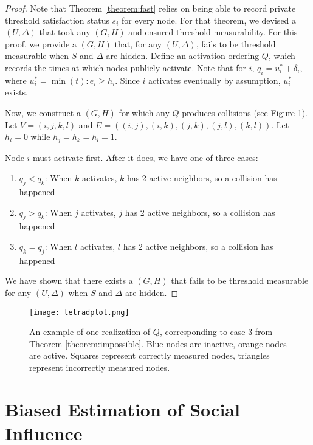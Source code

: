\documentclass[a4paper]{article}
\begin{document}
\begin{proof}
Note that Theorem \ref{theorem:fast} relies on being able to record private threshold satisfaction status $s_i$ for every node. For that theorem, we devised a $(U, \Delta)$ that took any $(G, H)$ and ensured threshold measurability. For this proof, we provide a $(G, H)$ that, for any $(U, \Delta)$, fails to be threshold measurable when $S$ and $\Delta$ are hidden. Define an activation ordering $Q$, which records the times at which nodes publicly activate. Note that for $i$, $q_i = u_i^* + \delta_i$, where $u_i^* = \min(t) : e_i \ge h_i$. Since $i$ activates eventually by assumption, $u_i^*$ exists.

Now, we construct a $(G, H)$ for which any $Q$ produces collisions (see Figure \ref{fig:tetradplot}). Let $V = (i, j, k, l)$ and $E = ((i, j), (i, k), (j, k), (j, l), (k, l))$. Let $h_i = 0$ while $h_j = h_k = h_l = 1$.

Node $i$ must activate first. After it does, we have one of three cases:
\begin{enumerate} \label{theorem:impossible}
\item $q_j < q_k$: When $k$ activates, $k$ has 2 active neighbors, so a collision has happened
\item $q_j > q_k$: When $j$ activates, $j$ has 2 active neighbors, so a collision has happened
\item $q_k = q_j$: When $l$ activates, $l$ has 2 active neighbors, so a collision has happened
\end{enumerate}

\noindent
We have shown that there exists a $(G, H)$ that fails to be threshold measurable for any $(U, \Delta)$ when $S$ and $\Delta$ are hidden.

\end{proof}

\begin{figure}[h]
\label{fig:tetradplot}
\texttt{[image: tetradplot.png]}
\caption{An example of one realization of $Q$, corresponding to case 3 from Theorem \ref{theorem:impossible}. Blue nodes are inactive, orange nodes are active. Squares represent correctly measured nodes, triangles represent incorrectly measured nodes.}
\end{figure}

\section{Biased Estimation of Social Influence}
\end{document}
